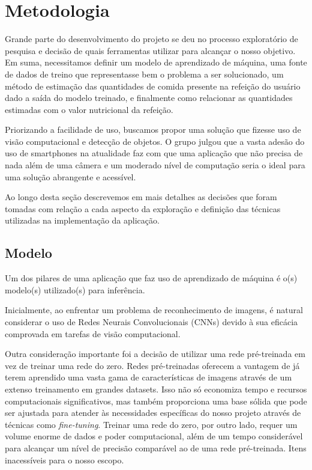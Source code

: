 \documentclass[journal]{IEEEtran}
\begin{document}
\section{Metodologia}
\label{sec:metodologia}
Grande parte do desenvolvimento do projeto se deu no processo exploratório de pesquisa e decisão de quais ferramentas utilizar para alcançar o nosso objetivo. Em suma, necessitamos definir um modelo de aprendizado de máquina, uma fonte de dados de treino que representasse bem o problema a ser solucionado, um método de estimação das quantidades de comida presente na refeição do usuário dado a saída do modelo treinado, e finalmente como relacionar as quantidades estimadas com o valor nutricional da refeição.

Priorizando a facilidade de uso, buscamos propor uma solução que fizesse uso de visão computacional e detecção de objetos. O grupo julgou que a vasta adesão do uso de smartphones na atualidade faz com que uma aplicação que não precisa de nada além de uma câmera e um moderado nível de computação seria o ideal para uma solução abrangente e acessível.

Ao longo desta seção descrevemos em mais detalhes as decisões que foram tomadas com relação a cada aspecto da exploração e definição das técnicas utilizadas na implementação da aplicação.

\subsection{Modelo}
\label{sec:model}
Um dos pilares de uma aplicação que faz uso de aprendizado de máquina é o(s) modelo(s) utilizado(s) para inferência.

Inicialmente, ao enfrentar um problema de reconhecimento de imagens, é natural considerar o uso de Redes Neurais Convolucionais (CNNs) devido à sua eficácia comprovada em tarefas de visão computacional.

Outra consideração importante foi a decisão de utilizar uma rede pré-treinada em vez de treinar uma rede do zero. Redes pré-treinadas oferecem a vantagem de já terem aprendido uma vasta gama de características de imagens através de um extenso treinamento em grandes datasets. Isso não só economiza tempo e recursos computacionais significativos, mas também proporciona uma base sólida que pode ser ajustada para atender às necessidades específicas do nosso projeto através de técnicas como \textit{fine-tuning}. Treinar uma rede do zero, por outro lado, requer um volume enorme de dados e poder computacional, além de um tempo considerável para alcançar um nível de precisão comparável ao de uma rede pré-treinada. Itens inacessíveis para o nosso escopo.
\end{document}
